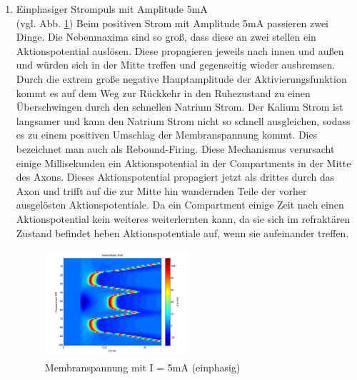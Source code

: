 \documentclass[conference]{IEEEtran}
\begin{document}
\begin{enumerate}
\item Einphasiger Strompuls mit Amplitude 5mA\\ (vgl. Abb. \ref{fig:mono_pos_5_1}) Beim positiven Strom mit Amplitude 5mA passieren zwei Dinge. Die Nebenmaxima sind so groß, dass diese an zwei stellen ein Aktionspotential auslösen. Diese propagieren jeweils nach innen und außen und würden sich in der Mitte treffen und gegenseitig wieder ausbremsen. Durch die extrem große negative Hauptamplitude der Aktivierungsfunktion kommt es auf dem Weg zur Rückkehr in den Ruhezustand zu einen Überschwingen durch den schnellen Natrium Strom. Der Kalium Strom ist langsamer und kann den Natrium Strom nicht so schnell ausgleichen, sodass es zu einem positiven Umschlag der Membranspannung kommt. Dies bezeichnet man auch als Rebound-Firing. Diese Mechanismus verursacht einige Millisekunden ein Aktionspotential in der Compartments in der Mitte des Axons. Dieses Aktionspotential propagiert jetzt als drittes durch das Axon und trifft auf die zur Mitte hin wandernden Teile der vorher ausgelösten Aktionspotentiale. Da ein Compartment einige Zeit nach einen Aktionspotential kein weiteres weiterlernten kann, da sie sich im refraktären Zustand befindet heben Aktionspotentiale auf, wenn sie aufeinander treffen. 
\begin{figure}[h!]
	\centering
	\vspace{-10pt}
	\includegraphics[width=0.5\textwidth]{img/mono_pos_5_1.png}
	\vspace{-30pt}
	\caption{Membranspannung mit I = 5mA (einphasig)}
	\vspace{-10pt}
	\label{fig:mono_pos_5_1}
\end{figure}

\end{enumerate}
\end{document}
